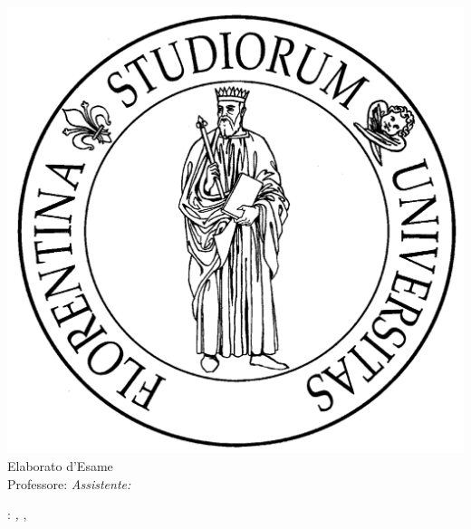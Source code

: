 \begin{titlepage}
	\begin{center}
   	\large
      \hfill
      \vfill
      \begingroup
			\spacedallcaps{\myUni} \\ 
			\myFaculty \\
			\myDegree \\ 
			\vspace{0.5cm}
         \includegraphics[scale=.065]{logo/unifi}\\
         \vspace{0.5cm}    
         Elaborato d'Esame
      \endgroup 
      \vfill 
      \begingroup
      	\color{Maroon}\spacedallcaps{\myTitle} \\ \bigskip
      \endgroup
      \spacedlowsmallcaps{\myName}
      \vfill  
      Professore: \itshape{\myProf}
      \vfill
      Assistente: \itshape{\myOtherProf}
      \vfill  
      \myTime
      \vfill                      
	\end{center}        
\end{titlepage}   
   \newpage
	\thispagestyle{empty}
	\hfill
	\vfill
	\noindent\myName: 
	\textit{\myTitle,} 
	\myDegree, \textcopyright\ \myTime
